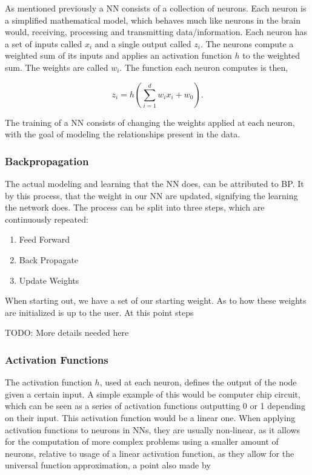 As mentioned previously a \gls{NN} consists of a collection of neurons. Each
neuron is a simplified mathematical model, which behaves much like neurons in
the brain would, receiving, processing and transmitting data/information. Each
neuron has a set of inputs called $x_i$ and a single output called $z_i$. The
neurons compute a weighted sum of its inputs and applies an activation function
$h$ to the weighted sum. The weights are called $w_i$. The function each neuron
computes is then,

\begin{equation}
    z_i = h\left(
        \sum_{i = 1}^d w_ix_i + w_0
    \right).
\end{equation}

The training of a \gls{NN} consists of changing the weights applied at each
neuron, with the goal of modeling the relationships present in the data.

\subsubsection{Backpropagation}\label{sec:BP}
The actual modeling and learning that the \gls{NN} does, can be attributed
to \gls{BP}. It by this process, that the weight in our \gls{NN} are updated,
signifying the learning the network does. The process can be split into three
steps, which are continuously repeated:
\begin{enumerate}
    \item Feed Forward
    \item Back Propagate
    \item Update Weights
\end{enumerate}
When starting out, we have a set of our starting weight. As to how these weights
are initialized is up to the user. At this point steps 


TODO: More details needed here


\subsubsection{Activation Functions}
The activation function $h$, used at each neuron, defines the output of the
node given a certain input. A simple example of this would be computer chip
circuit, which can be seen as a series of activation functions outputting 0 or
1 depending on their input. This activation function would be a linear one.
When applying activation functions to neurons in \gls{NN}s, they are usually
non-linear, as it allows for the computation of more complex problems using a
smaller amount of neurons, relative to usage of a linear activation function,
as they allow for the universal function approximation, a point also made by
\cite{6797088}

